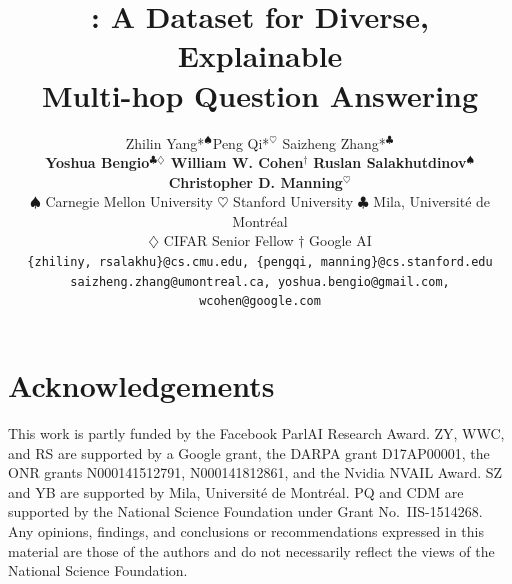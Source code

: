 \documentclass[11pt,a4paper]{article}
\title{\datasetname: A Dataset for Diverse, Explainable\\
Multi-hop Question Answering}
\author{
  Zhilin Yang*$^{\spadesuit}$\quad Peng Qi*$^{\heartsuit}$ \quad Saizheng Zhang*$^{\clubsuit}$ \\
  \textbf{Yoshua Bengio$^{\clubsuit\diamondsuit}$ \quad William W. Cohen$^{\dagger}$} \quad
  \textbf{Ruslan Salakhutdinov$^{\spadesuit}$ \quad Christopher D. Manning$^{\heartsuit}$} \\
  {$\spadesuit$ Carnegie Mellon University \quad $\heartsuit$ Stanford University \quad $\clubsuit$ Mila, Universit\'e de Montr\'eal}\\
  {$\diamondsuit$ CIFAR Senior Fellow \quad $\dagger$ Google AI} \\
  {\tt \{zhiliny, rsalakhu\}@cs.cmu.edu, \{pengqi, manning\}@cs.stanford.edu}\\
  {\tt saizheng.zhang@umontreal.ca, yoshua.bengio@gmail.com, wcohen@google.com} \\
}
\date{}
\begin{document}
\maketitle

\renewcommand{\thefootnote}{\fnsymbol{footnote}}
\renewcommand{\thefootnote}{\arabic{footnote}}

















\section*{Acknowledgements}
This work is partly funded by the Facebook ParlAI Research Award. ZY, WWC, and RS are supported by a Google grant, the DARPA grant D17AP00001, the ONR grants N000141512791, N000141812861, and the Nvidia NVAIL Award.
SZ and YB are supported by Mila, Universit\'e de Montr\'eal.
PQ and CDM are supported by the National Science Foundation under Grant No.\ IIS-1514268. Any opinions, findings, and conclusions or recommendations expressed in this material are those of the authors and do not necessarily reflect the views of the National Science Foundation.




\clearpage
\appendix


\end{document}
